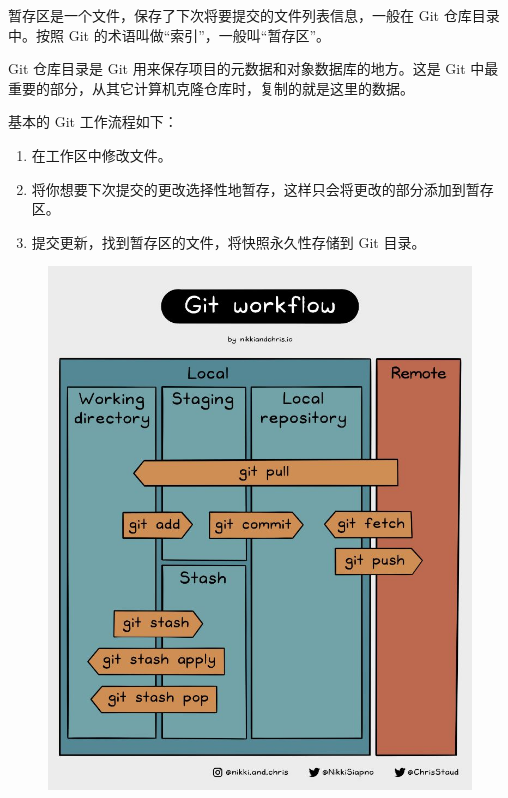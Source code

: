 \documentclass{ctexart}
\begin{document}
    暂存区是一个文件，保存了下次将要提交的文件列表信息，一般在 Git 仓库目录中。按照 Git 的术语叫做“索引”，一般叫“暂存区”。

    Git 仓库目录是 Git 用来保存项目的元数据和对象数据库的地方。这是 Git 中最重要的部分，从其它计算机克隆仓库时，复制的就是这里的数据。

    基本的 Git 工作流程如下：
\begin{enumerate}
    \item 在工作区中修改文件。
    \item 将你想要下次提交的更改选择性地暂存，这样只会将更改的部分添加到暂存区。
    \item 提交更新，找到暂存区的文件，将快照永久性存储到 Git 目录。
\end{enumerate}
\begin{figure}[htbp]
    \centering
    \includegraphics[scale = 0.28]{pictures/03.jpg}
    \qquad

\end{figure}
\end{document}

